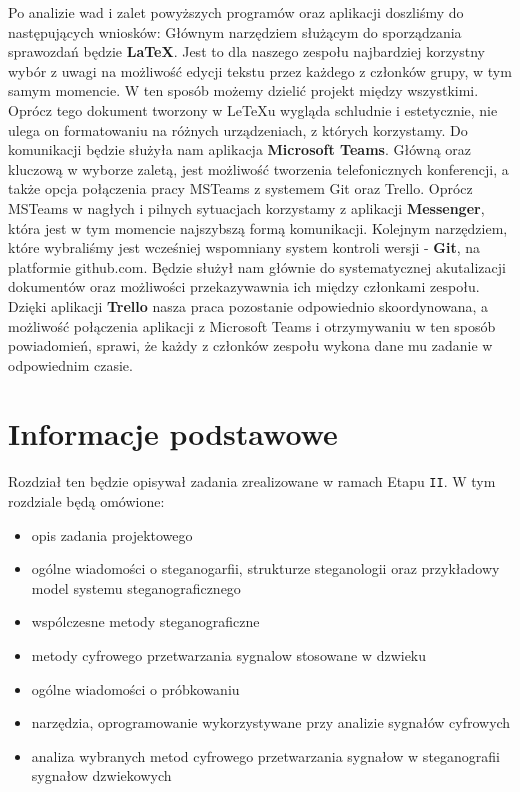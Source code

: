 \documentclass[a4paper,titleauthor]{mwart}
\begin{document}
	Po analizie wad i zalet powyższych programów oraz aplikacji doszliśmy do następujących wniosków: \newline
	Głównym narzędziem służącym do sporządzania sprawozdań będzie \textbf{LaTeX}. Jest to dla naszego zespołu najbardziej korzystny wybór z uwagi na możliwość edycji tekstu przez każdego z członków grupy, w tym samym momencie. W ten sposób możemy dzielić projekt między wszystkimi. Oprócz tego dokument tworzony w LeTeXu wygląda schludnie i estetycznie, nie ulega on formatowaniu na różnych urządzeniach, z których korzystamy. 
	Do komunikacji będzie służyła nam aplikacja \textbf{Microsoft Teams}. Główną oraz kluczową w wyborze zaletą, jest możliwość tworzenia telefonicznych konferencji, a także opcja połączenia pracy MSTeams z systemem Git oraz Trello.
	Oprócz MSTeams w nagłych i pilnych sytuacjach korzystamy z aplikacji \textbf{Messenger}, która jest w tym momencie najszybszą formą komunikacji. 
	Kolejnym narzędziem, które wybraliśmy jest wcześniej wspomniany system kontroli wersji - \textbf{Git}, na platformie github.com.
	Będzie służył nam głównie do systematycznej akutalizacji dokumentów oraz możliwości przekazywawnia ich między członkami zespołu. 
	Dzięki aplikacji \textbf{Trello} nasza praca pozostanie odpowiednio skoordynowana, a możliwość połączenia aplikacji z Microsoft Teams i otrzymywaniu w ten sposób powiadomień, sprawi, że każdy z członków zespołu wykona dane mu zadanie w odpowiednim czasie. 
	
	\section{Informacje podstawowe}
	\label{sec:informacje_podstawowe} 
	Rozdział ten będzie opisywał zadania zrealizowane w ramach Etapu \texttt{II}. W tym rozdziale będą omówione:\newline 
	\begin{itemize}
		\item opis zadania projektowego 
		\item ogólne wiadomości o steganogarfii, strukturze steganologii oraz przykładowy model systemu steganograficznego
		\item wspólczesne metody steganograficzne
		\item metody cyfrowego przetwarzania sygnalow stosowane w dzwieku
		\item ogólne wiadomości o próbkowaniu
		\item narzędzia, oprogramowanie wykorzystywane przy analizie sygnałów cyfrowych
		\item analiza wybranych metod cyfrowego przetwarzania sygnałow w steganografii sygnałow dzwiekowych 
	\end{itemize} 
\end{document}
